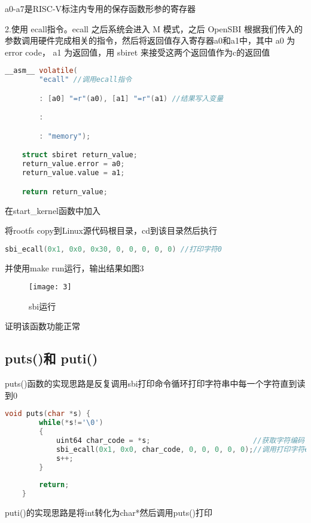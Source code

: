 \documentclass{source/Report}
\begin{document}
a0-a7是RISC-V标注内专用的保存函数形参的寄存器

2.使用 ecall指令。ecall 之后系统会进入 M 模式，之后 OpenSBI 根据我们传入的参数调用硬件完成相关的指令，然后将返回值存入寄存器a0和a1中，其中 a0 为 error code， a1 为返回值，用 sbiret 来接受这两个返回值作为c的返回值

\begin{lstlisting}[language = c, title = {ecall}]
    __asm__ volatile(
		"ecall" //调用ecall指令

		: [a0] "=r"(a0), [a1] "=r"(a1) //结果写入变量

		:

		: "memory");

	struct sbiret return_value;
	return_value.error = a0;
	return_value.value = a1;

	return return_value;
\end{lstlisting}

在start\_kernel函数中加入

将rootfs copy到Linux源代码根目录，cd到该目录然后执行

\begin{lstlisting}[language = c, title = {测试sbi}]
    sbi_ecall(0x1, 0x0, 0x30, 0, 0, 0, 0, 0) //打印字符0
\end{lstlisting}

并使用make run运行，输出结果如图3

\begin{figure}[p]
    \centering
    \texttt{[image: 3]}
    \caption{sbi运行}
\end{figure}

证明该函数功能正常

\subsection{puts()和 puti()}

puts()函数的实现思路是反复调用sbi打印命令循环打印字符串中每一个字符直到读到0

\begin{lstlisting}[language = c, title = {puts}]
    void puts(char *s) {
        while(*s!='\0')
        {
            uint64 char_code = *s;                        //获取字符编码
            sbi_ecall(0x1, 0x0, char_code, 0, 0, 0, 0, 0);//调用打印字符ecall
            s++;
        }
    
        return;
    }
\end{lstlisting}

puti()的实现思路是将int转化为char*然后调用puts()打印
\end{document}
